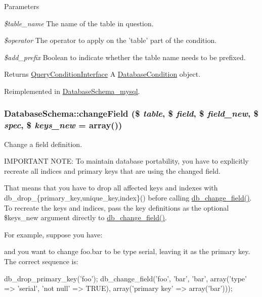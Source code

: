 \begin{DoxyParams}{Parameters}
\item[{\em \$table\_\-name}]The name of the table in question. \item[{\em \$operator}]The operator to apply on the 'table' part of the condition. \item[{\em \$add\_\-prefix}]Boolean to indicate whether the table name needs to be prefixed.\end{DoxyParams}
\begin{DoxyReturn}{Returns}
\hyperlink{interfaceQueryConditionInterface}{QueryConditionInterface} A \hyperlink{classDatabaseCondition}{DatabaseCondition} object. 
\end{DoxyReturn}


Reimplemented in \hyperlink{classDatabaseSchema__mysql_ae4fdb93f71666ee453610344b34d6763}{DatabaseSchema\_\-mysql}.\hypertarget{classDatabaseSchema_ab2470d34145fdbb413dd952baf7067be}{
\subsubsection[{changeField}]{\setlength{\rightskip}{0pt plus 5cm}DatabaseSchema::changeField (\$ {\em table}, \/  \$ {\em field}, \/  \$ {\em field\_\-new}, \/  \$ {\em spec}, \/  \$ {\em keys\_\-new} = {\ttfamily array()})}}
\label{classDatabaseSchema_ab2470d34145fdbb413dd952baf7067be}
Change a field definition.

IMPORTANT NOTE: To maintain database portability, you have to explicitly recreate all indices and primary keys that are using the changed field.

That means that you have to drop all affected keys and indexes with db\_\-drop\_\-\{primary\_\-key,unique\_\-key,index\}() before calling \hyperlink{group__schemaapi_ga9e0a4211eb8137e187d5f3f4fa716cea}{db\_\-change\_\-field()}. To recreate the keys and indices, pass the key definitions as the optional \$keys\_\-new argument directly to \hyperlink{group__schemaapi_ga9e0a4211eb8137e187d5f3f4fa716cea}{db\_\-change\_\-field()}.

For example, suppose you have: 
 and you want to change foo.bar to be type serial, leaving it as the primary key. The correct sequence is: 
\begin{DoxyCode}
 db_drop_primary_key('foo');
 db_change_field('foo', 'bar', 'bar',
   array('type' => 'serial', 'not null' => TRUE),
   array('primary key' => array('bar')));
\end{DoxyCode}


